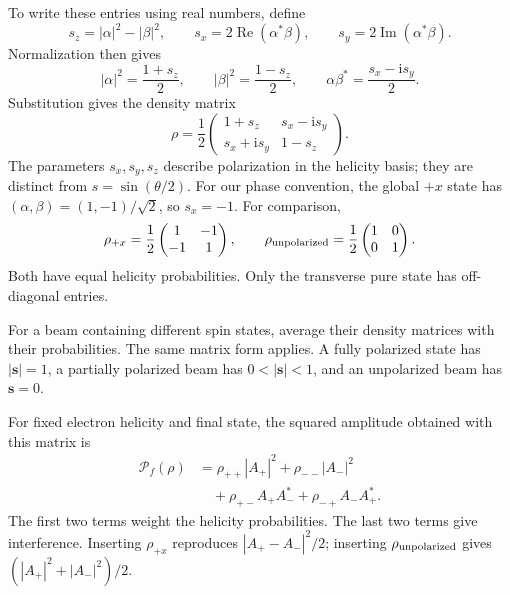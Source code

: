 \documentclass[12pt,a4paper]{article}
\numberwithin{equation}{section}
\newcommand{\ii}{\mathrm i}
\begin{document}
To write these entries using real numbers, define
\begin{equation}
 s_z=|\alpha|^2-|\beta|^2,\qquad
 s_x=2\operatorname{Re}(\alpha^*\beta),\qquad
 s_y=2\operatorname{Im}(\alpha^*\beta).
\end{equation}
Normalization then gives
\begin{equation}
 |\alpha|^2=\frac{1+s_z}{2},\qquad
 |\beta|^2=\frac{1-s_z}{2},\qquad
 \alpha\beta^*=\frac{s_x-\ii s_y}{2}.
\end{equation}
Substitution gives the density matrix
\begin{equation}
 \boxed{\rho=\frac12\begin{pmatrix}
 1+s_z&s_x-\ii s_y\\
 s_x+\ii s_y&1-s_z
 \end{pmatrix}.}
 \label{eq:spin-density-matrix}
\end{equation}
The parameters $s_x,s_y,s_z$ describe polarization in the helicity basis;
they are distinct from $s=\sin(\theta/2)$. For our phase convention, the
global $+x$ state has $(\alpha,\beta)=(1,-1)/\sqrt2$, so $s_x=-1$.
For comparison,
\begin{equation}
 \rho_{+x}=\frac12\begin{pmatrix}1&-1\\-1&1\end{pmatrix},\qquad
 \rho_{\rm unpolarized}=\frac12\begin{pmatrix}1&0\\0&1\end{pmatrix}.
\end{equation}
Both have equal helicity probabilities. Only the transverse pure state has
off-diagonal entries.

For a beam containing different spin states, average their density matrices
with their probabilities. The same matrix form applies. A fully polarized
state has $|\bm s|=1$, a partially polarized beam has $0<|\bm s|<1$, and an
unpolarized beam has $\bm s=0$.

For fixed electron helicity and final state, the squared amplitude obtained
with this matrix is
\begin{equation}
 \begin{aligned}
 \mathcal P_f(\rho)
 &=\rho_{++}|A_+|^2+\rho_{--}|A_-|^2\\
 &\quad+\rho_{+-}A_+A_-^*+\rho_{-+}A_-A_+^*.
 \end{aligned}
\end{equation}
The first two terms weight the helicity probabilities. The last two terms
give interference. Inserting $\rho_{+x}$ reproduces
$|A_+-A_-|^2/2$; inserting $\rho_{\rm unpolarized}$ gives
$(|A_+|^2+|A_-|^2)/2$.
\end{document}

